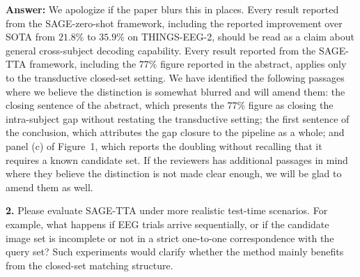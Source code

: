 \documentclass[11pt]{article}
\newcommand{\answer}[1]{{\textbf{Answer:} \color{blue} #1}}
\begin{document}
\answer{
We apologize if the paper blurs this in places.
Every result reported from the SAGE-zero-shot framework, including the reported improvement over SOTA from $21.8\%$ to $35.9\%$ on THINGS-EEG-2, should be read as a claim about general cross-subject decoding capability. Every result reported from the SAGE-TTA framework, including the $77\%$ figure reported in the abstract, applies only to the transductive closed-set setting. We have identified the following passages where we believe the distinction is somewhat blurred and will amend them: the closing sentence of the abstract, which presents the $77\%$ figure as closing the intra-subject gap without restating the transductive setting; the first sentence of the conclusion, which attributes the gap closure to the pipeline as a whole; and panel (c) of Figure~1, which reports the doubling without recalling that it requires a known candidate set. If the reviewers has additional passages in mind where they believe the distinction is not made clear enough, we will be glad to amend them as well.
}

\textbf{2.} Please evaluate SAGE-TTA under more realistic test-time scenarios. For example, what
happens if EEG trials arrive sequentially, or if the candidate image set is incomplete or not in a
strict one-to-one correspondence with the query set? Such experiments would clarify whether the method
mainly benefits from the closed-set matching structure.
\end{document}
